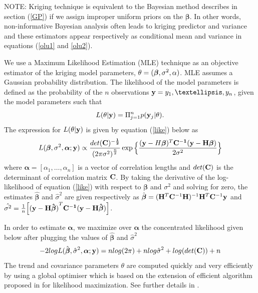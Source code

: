 \documentclass[12pt,titlepage]{report}
\newcommand{\bH}{{\bf H}}
\newcommand{\bC}{{\bf C}}
\newcommand{\by}{{\bf y}}
\newcommand{\bbeta}{{\boldsymbol{\beta}}}
\newcommand{\hbbeta}{{\hat{\boldsymbol{\beta}}}}
\newcommand{\balpha}{{\boldsymbol{\alpha}}}
\theoremstyle{definition}
\theoremstyle{remark}
\begin{document}
NOTE: Kriging technique is equivalent to the Bayesian method describes in section (\ref{GP}) if we assign improper uniform priors on the $\bbeta$. In other words, non-informative Bayesian analysis often leads to kriging predictor and variance and these estimators appear respectively as conditional mean and variance in equations (\ref{olu1} and \ref{olu2}).

We use a Maximum Likelihood Estimation (MLE) technique as an objective estimator of the kriging model parameters, $\theta=(\bbeta,\sigma^2,\boldmath \alpha)$. MLE assumes a Gaussian probability distribution. 
The likelihood of the model parameters is defined as the probability of the $n$ observations $\by= {y_1, …, y_n}$, given the model parameters such that 
\begin{equation}
L(\theta|\by)= \Pi_{j=1}^n p(\by_j|\theta).
\end{equation}
The expression for $L(\theta|\by)$ is given by equation (\ref{like}) below as
\begin{equation}\label{like}
L(\boldsymbol \beta, \sigma^2, \boldsymbol{\alpha};\by)\propto \frac{det(\bf C)^{-\frac{1}{2}}}{{(2\pi\sigma^2)}^\frac{n}{2}}\exp \Big \{\frac{(\by-H\boldsymbol \beta)^T \bf C^{-1}(\by-H\boldsymbol \beta)}{2\sigma^2}\Big\}
\end{equation}
where $\boldsymbol{\alpha}=[\alpha_1, \ldots, \alpha_n]$ is a vector of correlation lengths and $det(\bf C)$ is the determinant of correlation matrix $\bC$.
By taking the derivative of the log-likelihood of equation (\ref{like}) with
respect to $\bbeta$ and $\sigma^2$ and solving for zero, the estimates $\hbbeta$ and $\hat\sigma^2$ are given respectively as $\hbbeta=(\bH^T\bC^{-1}\bH)^{-1}\bH^T\bC^{-1}\by$ and $\hat{\sigma^2}=\frac{1}{n}\Big[\mathbf{(y-H\hat{\boldsymbol \beta})}^T\bf C^{-1}(\bf y-H\hat{\boldsymbol \beta})\Big]$.

In order to estimate $\balpha$, we maximize over $\balpha$ the concentrated likelihood given below after plugging the values of $\hbbeta$ and $\hat\sigma^2$
\begin{equation}
-2 log L(\hbbeta, \hat \sigma^2, \balpha; \by) = n log(2\pi) + n log\hat \sigma^2 + log(det(\bC)) + n
\end{equation}
The trend and covariance parameters $\theta$ are computed quickly and very efficiently by using a global optimiser which is based on the extension of efficient algorithm proposed in \cite{pd9} for likelihood maximization. See further details in \citep{pd8}.
\end{document}
